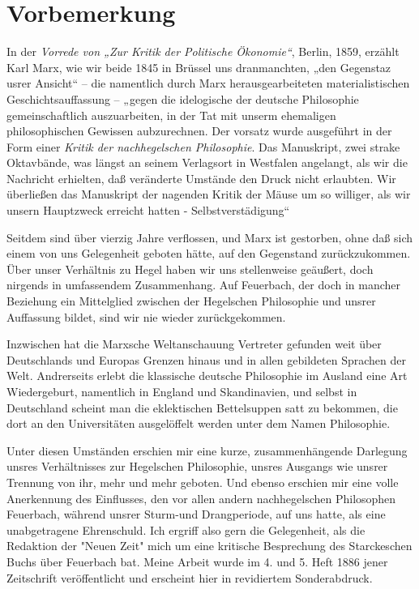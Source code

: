 {\let\clearpage\relax\chapter*{Vorbemerkung}}

In der \emph{Vorrede von „Zur Kritik der Politische Ökonomie``},
Berlin, 1859, erzählt Karl Marx, wie wir beide 1845 in Brüssel uns
dranmanchten, „den Gegenstaz usrer Ansicht`` -- die namentlich durch
Marx herausgearbeiteten materialistischen Geschichtsauffassung -- „gegen
die idelogische der deutsche Philosophie gemeinschaftlich auszuarbeiten,
in der Tat mit unserm ehemaligen philosophischen Gewissen aubzurechnen.
Der vorsatz wurde ausgeführt in der Form einer \emph{Kritik der
nachhegelschen Philosophie}. Das Manuskript, zwei strake Oktavbände, was
längst an seinem Verlagsort in Westfalen angelangt, als wir die
Nachricht erhielten, daß veränderte Umstände den Druck nicht erlaubten.
Wir überließen das Manuskript der nagenden Kritik der Mäuse um so
williger, als wir unsern Hauptzweck erreicht hatten -
Selbstverstädigung``

Seitdem sind über vierzig Jahre verflossen, und Marx ist
gestorben, ohne daß sich einem von uns Gelegenheit geboten hätte, auf
den Gegenstand zurückzukommen. Über unser Verhältnis zu Hegel haben wir
uns stellenweise geäußert, doch nirgends in umfassendem Zusammenhang.
Auf Feuerbach, der doch in mancher Beziehung ein Mittelglied zwischen
der Hegelschen Philosophie und unsrer Auffassung bildet, sind wir nie
wieder zurückgekommen.

Inzwischen hat die Marxsche Weltanschauung Vertreter gefunden
weit über Deutschlands und Europas Grenzen hinaus und in allen
gebildeten Sprachen der Welt. Andrerseits erlebt die klassische deutsche
Philosophie im Ausland eine Art Wiedergeburt, namentlich in England und
Skandinavien, und selbst in Deutschland scheint man die eklektischen
Bettelsuppen satt zu bekommen, die dort an den Universitäten ausgelöffelt werden unter dem Namen Philosophie.

Unter diesen Umständen erschien mir eine kurze, zusammenhängende
Darlegung unsres Verhältnisses zur Hegelschen Philosophie, unsres
Ausgangs wie unsrer Trennung von ihr, mehr und mehr geboten. Und ebenso
erschien mir eine volle Anerkennung des Einflusses, den vor allen andern
nachhegelschen Philosophen Feuerbach, während unsrer Sturm-und
Drangperiode, auf uns hatte, als eine unabgetragene Ehrenschuld. Ich
ergriff also gern die Gelegenheit, als die Redaktion der "Neuen Zeit"
mich um eine kritische Besprechung des Starckeschen Buchs über Feuerbach
bat. Meine Arbeit wurde im 4. und 5. Heft 1886 jener Zeitschrift
veröffentlicht und erscheint hier in revidiertem Sonderabdruck.

